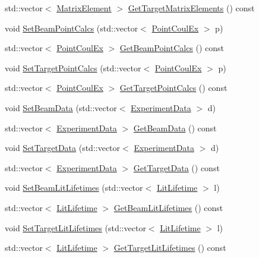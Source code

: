 \begin{DoxyCompactItemize}
std\-::vector$<$ \hyperlink{classMatrixElement}{Matrix\-Element} $>$ \hyperlink{classCoulExSimMinFCN_aa17048ccb98ff35231823c5975ec9958}{Get\-Target\-Matrix\-Elements} () const 
\item 
void \hyperlink{classCoulExSimMinFCN_a0086b89efacd4d0698ec389debfc78fa}{Set\-Beam\-Point\-Calcs} (std\-::vector$<$ \hyperlink{classPointCoulEx}{Point\-Coul\-Ex} $>$ p)
\item 
std\-::vector$<$ \hyperlink{classPointCoulEx}{Point\-Coul\-Ex} $>$ \hyperlink{classCoulExSimMinFCN_a42110b2d9c5f0a82e38957e7d24c4a6b}{Get\-Beam\-Point\-Calcs} () const 
\item 
void \hyperlink{classCoulExSimMinFCN_aaa8b923e56d3dc288c4ae4e247c4acdd}{Set\-Target\-Point\-Calcs} (std\-::vector$<$ \hyperlink{classPointCoulEx}{Point\-Coul\-Ex} $>$ p)
\item 
std\-::vector$<$ \hyperlink{classPointCoulEx}{Point\-Coul\-Ex} $>$ \hyperlink{classCoulExSimMinFCN_af4d889b4f5820df626171f83e62ae14a}{Get\-Target\-Point\-Calcs} () const 
\item 
void \hyperlink{classCoulExSimMinFCN_ae44b5ec9b30bf5b9b5ba05b3ef9d721c}{Set\-Beam\-Data} (std\-::vector$<$ \hyperlink{classExperimentData}{Experiment\-Data} $>$ d)
\item 
std\-::vector$<$ \hyperlink{classExperimentData}{Experiment\-Data} $>$ \hyperlink{classCoulExSimMinFCN_a91299a20c2d81e35da8c8d6ac031b95f}{Get\-Beam\-Data} () const 
\item 
void \hyperlink{classCoulExSimMinFCN_ab819406a8e0eda8cec3223517e2e7c1e}{Set\-Target\-Data} (std\-::vector$<$ \hyperlink{classExperimentData}{Experiment\-Data} $>$ d)
\item 
std\-::vector$<$ \hyperlink{classExperimentData}{Experiment\-Data} $>$ \hyperlink{classCoulExSimMinFCN_a87d0ffe07ac8c385cb46a94cac9b0663}{Get\-Target\-Data} () const 
\item 
void \hyperlink{classCoulExSimMinFCN_a0475e3c8a2344beba5f5dc8946198a0b}{Set\-Beam\-Lit\-Lifetimes} (std\-::vector$<$ \hyperlink{classLitLifetime}{Lit\-Lifetime} $>$ l)
\item 
std\-::vector$<$ \hyperlink{classLitLifetime}{Lit\-Lifetime} $>$ \hyperlink{classCoulExSimMinFCN_a0befa19ec308c0ab970ed5b5e4acc9a8}{Get\-Beam\-Lit\-Lifetimes} () const 
\item 
void \hyperlink{classCoulExSimMinFCN_a2fe17c010d832438647a853b5f0a8e8f}{Set\-Target\-Lit\-Lifetimes} (std\-::vector$<$ \hyperlink{classLitLifetime}{Lit\-Lifetime} $>$ l)
\item 
std\-::vector$<$ \hyperlink{classLitLifetime}{Lit\-Lifetime} $>$ \hyperlink{classCoulExSimMinFCN_a555c32abf7d98c8d4073a025e6a3edcb}{Get\-Target\-Lit\-Lifetimes} () const 

\end{DoxyCompactItemize}
